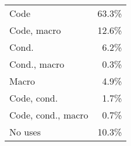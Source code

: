 \begin{tabular}{|l|r|} \hline
Code & 63.3\% \\
Code, macro & 12.6\% \\ \hline
Cond. & 6.2\% \\
Cond., macro & 0.3\% \\ \hline
Macro & 4.9\% \\ \hline
Code, cond. & 1.7\% \\
Code, cond., macro & 0.7\% \\ \hline
No uses & 10.3\% \\ \hline
\end{tabular}


